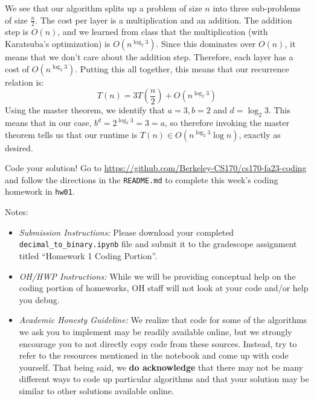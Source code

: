 \documentclass[11pt]{article}
\begin{document}
\begin{subparts}
\begin{solution}
	We see that our algorithm splits up a problem of size $n$ into three sub-problems of size $\frac{n}{2}$. 
	The cost per layer is a multiplication and an addition. The addition step is $O(n)$, and we learned from 
	class that the multiplication (with Karatsuba's optimization) is $O(n^{\log_2 3})$. Since this 
	dominates over $O(n)$, it means that we don't care about the addition step.
	Therefore, each layer has a cost of $O(n^{\log_2 3})$. Putting
	this all together, this means that our recurrence relation is:
	\[
		T(n) = 3T\left( \frac{n}{2} \right) + O(n^{\log_2 3})
	\] 
	Using the master theorem, we identify that $a = 3, b = 2$ and $d = \log_2 3$. This means that 
	in our case, $b^d = 2^{\log_2 3} = 3 = a$, so therefore invoking the master theorem tells us that 
	our runtime is $T(n) \in O(n^{\log_2 3} \log n)$, 
	exactly as desired. 
\end{solution}

\subpart Code your solution! Go to \url{https://github.com/Berkeley-CS170/cs170-fa23-coding} and follow the directions in the \texttt{README.md} to complete this week's coding homework in \texttt{hw01}.

\noindent Notes:
\begin{itemize}
    \item \textit{Submission Instructions:} Please download your completed \texttt{decimal\_to\_binary.ipynb} file and submit it to the gradescope assignment titled ``Homework 1 Coding Portion''. 
    
    \item \textit{OH/HWP Instructions:} While we will be providing conceptual help on the coding portion of homeworks, OH staff will not look at your code and/or help you debug.
    
    \item \textit{Academic Honesty Guideline:} We realize that code for some of the algorithms we ask you to implement may be readily available online, but we strongly encourage you to not directly copy code from these sources. Instead, try to refer to the resources mentioned in the notebook and come up with code yourself. That being said, we \textbf{do acknowledge} that there may not be many different ways to code up particular algorithms and that your solution may be similar to other solutions available online.
    
\end{itemize}

\end{subparts}
\end{document}
